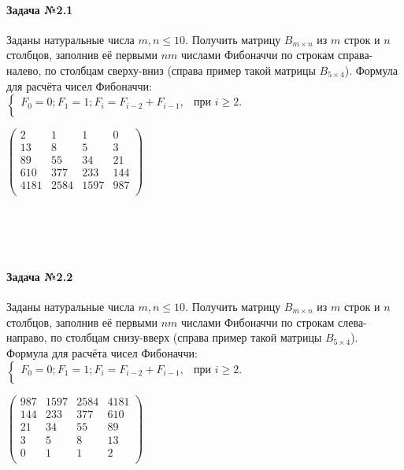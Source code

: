 \documentclass[12pt,a4paper]{report}
\begin{document}
\clearpage
\noindent %
\begin{minipage}{0.75\textwidth}
\paragraph*{Задача №2.1}
Заданы натуральные числа $m, n \le 10$. Получить матрицу $B_{m \times n}$ из $m$ строк и $n$ столбцов, заполнив её первыми $nm$ числами Фибоначчи по строкам справа-налево, по столбцам сверху-вниз (справа пример такой матрицы $B_{5 \times 4}$). Формула для расчёта чисел Фибоначчи: \\
$\begin{cases}
F_0 = 0; F_1 = 1; F_i = F_{i-2} + F_{i-1}, & \text{при } i \ge 2. \\
\end{cases}$
\end{minipage}
\hfill
\begin{minipage}{0.24\textwidth}
$\begin{pmatrix}
2 & 1 & 1 & 0 \\
13 & 8 & 5 & 3 \\
89 & 55 & 34 & 21 \\
610 & 377 & 233 & 144 \\
4181 & 2584 & 1597 & 987 \\
\end{pmatrix}$
\end{minipage}
\\ \\ \\
\noindent %
\begin{minipage}{0.75\textwidth}
\paragraph*{Задача №2.2}
Заданы натуральные числа $m, n \le 10$. Получить матрицу $B_{m \times n}$ из $m$ строк и $n$ столбцов, заполнив её первыми $nm$ числами Фибоначчи по строкам слева-направо, по столбцам снизу-вверх (справа пример такой матрицы $B_{5 \times 4}$). Формула для расчёта чисел Фибоначчи: \\
$\begin{cases}
F_0 = 0; F_1 = 1; F_i = F_{i-2} + F_{i-1}, & \text{при } i \ge 2. \\
\end{cases}$
\end{minipage}
\hfill
\begin{minipage}{0.24\textwidth}
$\begin{pmatrix}
987 & 1597 & 2584 & 4181 \\
144 & 233 & 377 & 610 \\
21 & 34 & 55 & 89 \\
3 & 5 & 8 & 13 \\
0 & 1 & 1 & 2 \\
\end{pmatrix}$
\end{minipage}
\end{document}
